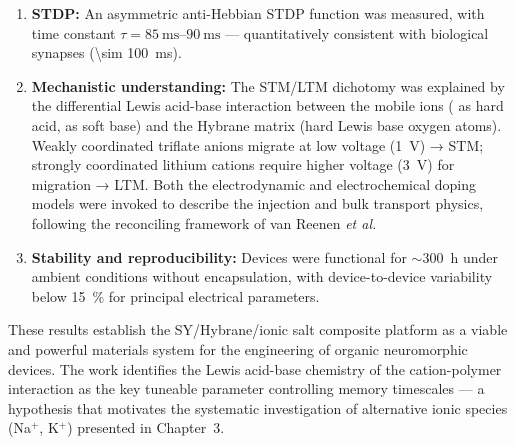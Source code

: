 \documentclass[12pt, a4paper, twoside]{report}
\begin{document}
\begin{enumerate}
  \item \textbf{STDP:} An asymmetric anti-Hebbian STDP function was measured, with time constant $\tau = \SIrange{85}{90}{\milli\second}$ — quantitatively consistent with biological synapses (\SI{\sim 100}{\milli\second}).

  \item \textbf{Mechanistic understanding:} The STM/LTM dichotomy was explained by the differential Lewis acid-base interaction between the mobile ions ( as hard acid,  as soft base) and the Hybrane matrix (hard Lewis base oxygen atoms). Weakly coordinated triflate anions migrate at low voltage (\SI{1}{\volt}) → STM; strongly coordinated lithium cations require higher voltage (\SI{3}{\volt}) for migration → LTM. Both the electrodynamic and electrochemical doping models were invoked to describe the injection and bulk transport physics, following the reconciling framework of van Reenen \textit{et al.}

  \item \textbf{Stability and reproducibility:} Devices were functional for $\sim$\SI{300}{\hour} under ambient conditions without encapsulation, with device-to-device variability below \SI{15}{\percent} for principal electrical parameters.
\end{enumerate}

These results establish the SY/Hybrane/ionic salt composite platform as a viable and powerful materials system for the engineering of organic neuromorphic devices. The work identifies the Lewis acid-base chemistry of the cation-polymer interaction as the key tuneable parameter controlling memory timescales — a hypothesis that motivates the systematic investigation of alternative ionic species (Na$^+$, K$^+$) presented in Chapter~3.


\printbibliography[heading=bibintoc, title={References}]
\end{document}

